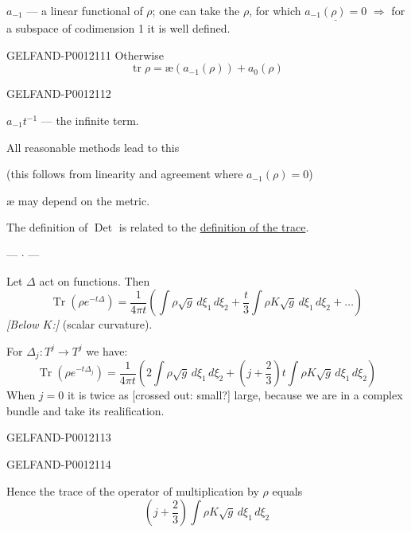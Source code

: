 \(a_{-1}\) --- a linear functional of \(\rho\); one can take the \(\rho\), for which \(\underline{a_{-1}(\rho)=0}\)
\(\Rightarrow\) for a subspace of codimension 1 it is well defined.


\begin{GelfandAdjacentEvidence}{GELFAND-P001211}{1}
Otherwise
\[
\operatorname{tr}\rho=\text{\ae}(a_{-1}(\rho))+a_0(\rho)
\]
\end{GelfandAdjacentEvidence}
\begin{GelfandAdjacentEvidence}{GELFAND-P001211}{2}


\(a_{-1}t^{-1}\) --- the infinite term.

All reasonable methods lead to this

(this follows from linearity and agreement where \(a_{-1}(\rho)=0\))

\(\text{\ae}\) may depend on the metric.

The definition of \(\operatorname{Det}\) is related to the \underline{definition of the trace}.

\begin{center}--- \(\cdot\) ---\end{center}
Let \(\Delta\) act on functions. Then
\[
\operatorname{Tr}(\rho e^{-t\Delta})=
\frac1{4\pi t}\left(\int\rho\sqrt g\,d\xi_1\,d\xi_2
+\frac t3\int\rho K\sqrt g\,d\xi_1\,d\xi_2+\ldots\right)
\]
\textit{[Below \(K\):]} (scalar curvature).

For \(\Delta_j:T^j\to T^j\) we have:
\[
\operatorname{Tr}(\rho e^{-t\Delta_j})=
\frac1{4\pi t}\left(2\int\rho\sqrt g\,d\xi_1\,d\xi_2
+\left(j+\frac23\right)t\int\rho K\sqrt g\,d\xi_1\,d\xi_2\right)
\]
When \(j=0\) it is twice as [crossed out: small?] large, because we are in a complex bundle and take its realification.
\end{GelfandAdjacentEvidence}
\begin{GelfandAdjacentEvidence}{GELFAND-P001211}{3}

\end{GelfandAdjacentEvidence}
\begin{GelfandAdjacentEvidence}{GELFAND-P001211}{4}


Hence the trace of the operator of multiplication by \(\rho\) equals
\[
\left(j+\frac23\right)\int\rho K\sqrt g\,d\xi_1\,d\xi_2
\]
\end{GelfandAdjacentEvidence}
